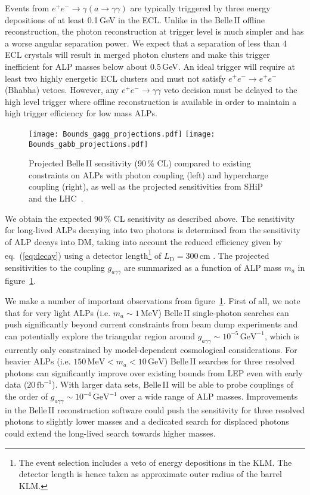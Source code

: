 \documentclass[11pt,a4paper]{article}
\newcommand{\ga}{g_{a\gamma\gamma}}
\def \belletwo {Belle\,II\xspace}
\begin{document}
Events from $e^+e^-\to \gamma (a\to\gamma\gamma)$ are typically triggered by three energy depositions of at least 0.1\,GeV in the ECL. Unlike in the \belletwo offline reconstruction, the photon reconstruction at trigger level is much simpler and has a worse angular separation power. We expect that a separation of less than 4 ECL crystals will result in merged photon clusters and make this trigger inefficient for ALP masses below about 0.5\,GeV. An ideal trigger will require at least two highly energetic ECL clusters and must not satisfy  $e^+e^-\to e^+e^-$  (Bhabha) vetoes. However, any $e^+e^-\to\gamma\gamma$ veto decision must be delayed to the high level trigger where offline reconstruction is available in order to maintain a high trigger efficiency for low mass ALPs.

\begin{figure}
\centering
\texttt{[image: Bounds\_gagg\_projections.pdf]}\qquad
\texttt{[image: Bounds\_gabb\_projections.pdf]}
\caption{\label{fig:BelleII} Projected \belletwo sensitivity (90\,\% CL) compared to existing constraints on ALPs with photon coupling (left) and hypercharge coupling (right), as well as the projected sensitivities from SHiP~\cite{Dobrich:2015jyk} and the LHC~\cite{Bauer:2017ris}.}
\end{figure}

We obtain the expected 90\,\% CL sensitivity as described above. The sensitivity for long-lived ALPs decaying into two photons is determined from the sensitivity of ALP decays into DM, taking into account the reduced efficiency given by eq.~(\ref{eq:decay}) using a detector length\footnote{The event selection includes a veto of energy depositions in the KLM. The detector length is hence taken as approximate outer radius of the barrel KLM.} of $L_\mathrm{D}=300$\,cm \cite{Abashian:2000cg}. The projected sensitivities to the coupling $\ga$ are summarized as a function of ALP mass $m_{a}$ in figure~\ref{fig:BelleII}.

We make a number of important observations from figure~\ref{fig:BelleII}. First of all, we note that for very light ALPs (i.e. $m_a \sim 1\,\mathrm{MeV}$) \belletwo single-photon searches can push significantly beyond current constraints from beam dump experiments and can potentially explore the triangular region around $\ga \sim 10^{-5}\,\mathrm{GeV^{-1}}$, which is currently only constrained by model-dependent cosmological considerations. For heavier ALPs (i.e. $150\,\mathrm{MeV} < m_a < 10\,\mathrm{GeV}$) \belletwo searches for three resolved photons can significantly improve over existing bounds from LEP even with early data ($20\,\mathrm{fb^{-1}}$). With larger data sets, \belletwo will be able to probe couplings of the order of $\ga \sim 10^{-4}\,\mathrm{GeV^{-1}}$ over a wide range of ALP masses. Improvements in the \belletwo reconstruction software could push the sensitivity for three resolved photons to slightly lower masses and a dedicated search for displaced photons could extend the long-lived search towards higher masses.
\end{document}
